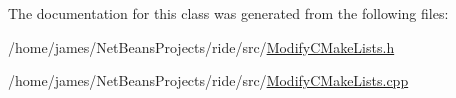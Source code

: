 The documentation for this class was generated from the following files\-:\begin{DoxyCompactItemize}
\item 
/home/james/\-Net\-Beans\-Projects/ride/src/\hyperlink{_modify_c_make_lists_8h}{Modify\-C\-Make\-Lists.\-h}\item 
/home/james/\-Net\-Beans\-Projects/ride/src/\hyperlink{_modify_c_make_lists_8cpp}{Modify\-C\-Make\-Lists.\-cpp}\end{DoxyCompactItemize}

